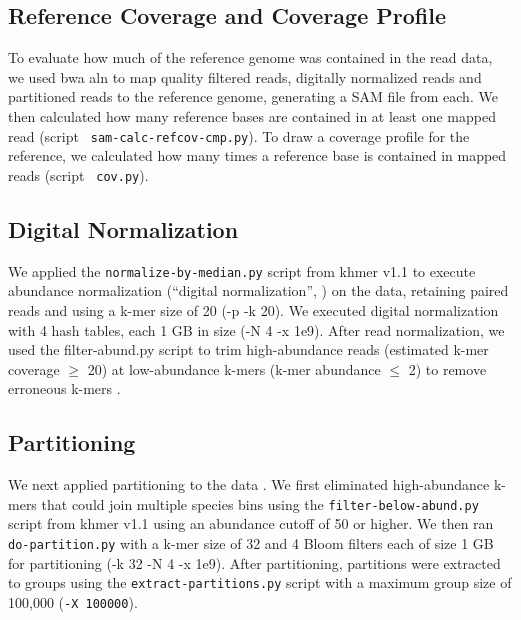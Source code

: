 \subsection*{Reference Coverage and Coverage Profile} 

To evaluate how much of the reference genome was contained in the read
data, we used bwa aln to map quality filtered reads, digitally
normalized reads and partitioned reads to the reference genome,
generating a SAM file from each.  We then calculated how many
reference bases are contained in at least one mapped read (script {\tt
sam-calc-refcov-cmp.py}). To draw a coverage profile for the reference, we calculated how many times a reference base is contained in mapped reads (script {\tt
cov.py}). 

\subsection*{Digital Normalization} 

We applied the {\tt normalize-by-median.py} script from khmer v1.1 to
execute abundance normalization (``digital normalization'', \cite{brown2012})  on the data, retaining paired reads and using a
k-mer size of 20 (-p -k 20).  We executed digital normalization with 4
hash tables, each 1 GB in size (-N 4 -x 1e9).  After read
normalization, we used the filter-abund.py script to trim
high-abundance reads (estimated k-mer coverage $\geq$ 20) at low-abundance
k-mers (k-mer abundance $\leq$ 2)   %
to remove erroneous k-mers  \cite{qingpeng2014} \cite{streaming}. 


\subsection*{Partitioning} 

We next applied partitioning to the data \cite{jpell2012, ahowe2014}.
We first eliminated high-abundance k-mers that could join multiple
species bins using the {\tt filter-below-abund.py} script from khmer v1.1 using an abundance cutoff of 50 or higher.
We then ran {\tt do-partition.py} with a k-mer size of 32 and 4 Bloom
filters each of size 1 GB for partitioning (-k 32 -N 4 -x 1e9).  After
partitioning, partitions were extracted to groups using the {\tt extract-partitions.py} script with a maximum group size of 100,000 ({\tt -X 100000}).

